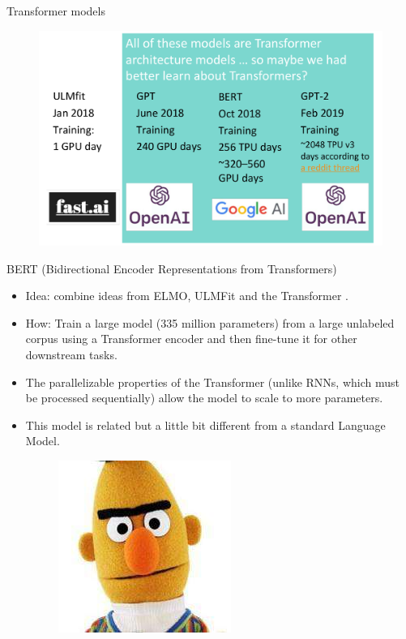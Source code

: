 \documentclass[handout]{beamer}
\begin{document}
\begin{frame}{Transformer models}


     \begin{figure}[h]
        	\includegraphics[scale = 0.28]{pics/llmscale_trans.png}
        \end{figure}  


\end{frame}

\begin{frame}{BERT (Bidirectional Encoder Representations from Transformers)}
\begin{scriptsize}
\begin{itemize}
\item Idea: combine ideas from ELMO, ULMFit and the Transformer \cite{kenton2019bert}.
\item How: Train a large model (335 million parameters) from a large unlabeled corpus using a Transformer encoder and then fine-tune it for other downstream tasks.
\item The parallelizable properties of the Transformer (unlike RNNs, which must be processed sequentially) allow the model to scale to more parameters.
\item This model is related but a little bit different from a standard Language Model.

     \begin{figure}[h]
        	\includegraphics[scale = 0.4]{pics/bert.png}
        \end{figure}  




\end{itemize}
\end{scriptsize}
\end{frame}
\end{document}
